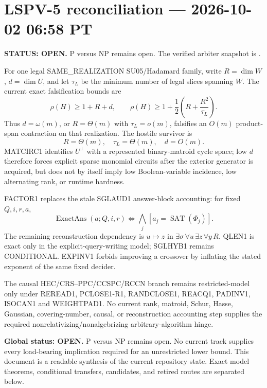 \documentclass[11pt]{article}
\newcommand{\statusopen}{\textcolor{openstatus}{\textbf{OPEN}}}
\begin{document}
\section{LSPV-5 reconciliation --- 2026-10-02 06:58 PT}
\textbf{STATUS: OPEN.} P versus NP remains open. The verified arbiter snapshot is
.

For one legal SAME\_REALIZATION SU05/Hadamard family, write
\(R=\dim W\), \(d=\dim U\), and let \(\tau_L\) be the minimum number of legal slices spanning \(W\).
The current exact falsification bounds are
\[
\boxed{\rho(H)\ge1+R+d},\qquad
\boxed{\rho(H)\ge1+\frac12\left(R+\frac{R^2}{\tau_L}\right)}.
\]
Thus \(d=\omega(m)\), or \(R=\Theta(m)\) with \(\tau_L=o(m)\), falsifies an \(O(m)\)
product-span contraction on that realization.  The hostile survivor is
\[
\boxed{R=\Theta(m),\quad \tau_L=\Theta(m),\quad d=O(m).}
\]
MATCIRC1 identifies \(U^\perp\) with a represented binary-matroid cycle space; low \(d\) therefore
forces explicit sparse monomial circuits after the exterior generator is acquired, but does not
by itself imply low Boolean-variable incidence, low alternating rank, or runtime hardness.

FACTOR1 replaces the stale SGLAUD1 answer-block accounting: for fixed \(Q,i,r,a\),
\[
\operatorname{ExactAns}(a;Q,i,r)\iff\bigwedge_j[a_j=\operatorname{SAT}(\Phi_j)].
\]
The remaining reconstruction dependency is \(u\mapsto z\) in
\(\exists\sigma\,\forall u\,\exists z\,\forall y\,R\).
QLEN1 is exact only in the explicit-query-writing model; SGLHYB1 remains CONDITIONAL.
EXPINV1 forbids improving a crossover by inflating the stated exponent of the same fixed decider.

The causal HEC/CRS--PPC/CCSPC/RCCN branch remains restricted-model only under
REREAD1, PCLOSE1-R1, RANDCLOSE1, REACQ1, PADINV1, ISOCAN1 and WEIGHTPAD1.
No current rank, matroid, Schur, Hasse, Gaussian, covering-number, causal, or reconstruction
accounting step supplies the required nonrelativizing/nonalgebrizing arbitrary-algorithm hinge.


\maketitle
\tableofcontents
\bigskip
\newpage
\begin{statusbox}
\textbf{\Large Global status: \statusopen.}
P versus NP remains open. No current track supplies every load-bearing implication required for an
unrestricted lower bound. This document is a readable synthesis of the current repository state.
Exact model theorems, conditional transfers, candidates, and retired routes are separated below.
\end{statusbox}
\end{document}
